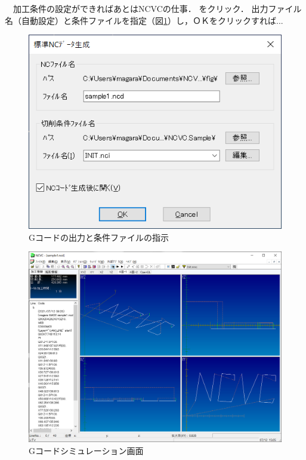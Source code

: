 \begin{minipage}[t]{0.5\textwidth}
　加工条件の設定ができればあとはNCVCの仕事．
 をクリック．
出力ファイル名（自動設定）と条件ファイルを指定（図\ref{fig:make.png}）し，ＯＫをクリックすれば...
\end{minipage}
\begin{minipage}[t]{0.5\textwidth}
\vspace*{-2zh}
\begin{figure}[H]
\centering
\includegraphics[scale=0.7]{No2/fig/make.png}
\caption{Gコードの出力と条件ファイルの指示}
\label{fig:make.png}
\end{figure}
\end{minipage}

\begin{figure}[H]
\centering
\includegraphics[scale=0.55]{No2/fig/sample01.png}
\caption{Gコードシミュレーション画面}
\label{fig:sample1.png}
\end{figure}

